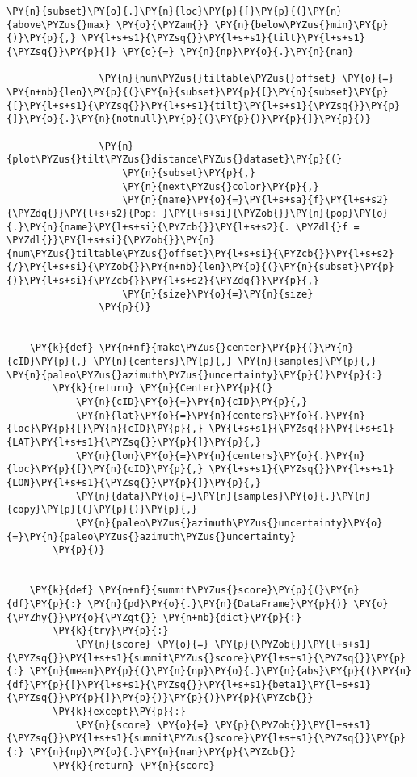 \begin{tcolorbox}[breakable, size=fbox, boxrule=1pt, pad at break*=1mm,colback=cellbackground, colframe=cellborder]
\begin{Verbatim}[commandchars=\\\{\}]
                \PY{n}{subset}\PY{o}{.}\PY{n}{loc}\PY{p}{[}\PY{p}{(}\PY{n}{above\PYZus{}max} \PY{o}{\PYZam{}} \PY{n}{below\PYZus{}min}\PY{p}{)}\PY{p}{,} \PY{l+s+s1}{\PYZsq{}}\PY{l+s+s1}{tilt}\PY{l+s+s1}{\PYZsq{}}\PY{p}{]} \PY{o}{=} \PY{n}{np}\PY{o}{.}\PY{n}{nan}
    
                \PY{n}{num\PYZus{}tiltable\PYZus{}offset} \PY{o}{=} \PY{n+nb}{len}\PY{p}{(}\PY{n}{subset}\PY{p}{[}\PY{n}{subset}\PY{p}{[}\PY{l+s+s1}{\PYZsq{}}\PY{l+s+s1}{tilt}\PY{l+s+s1}{\PYZsq{}}\PY{p}{]}\PY{o}{.}\PY{n}{notnull}\PY{p}{(}\PY{p}{)}\PY{p}{]}\PY{p}{)}
    
                \PY{n}{plot\PYZus{}tilt\PYZus{}distance\PYZus{}dataset}\PY{p}{(}
                    \PY{n}{subset}\PY{p}{,}
                    \PY{n}{next\PYZus{}color}\PY{p}{,}
                    \PY{n}{name}\PY{o}{=}\PY{l+s+sa}{f}\PY{l+s+s2}{\PYZdq{}}\PY{l+s+s2}{Pop: }\PY{l+s+si}{\PYZob{}}\PY{n}{pop}\PY{o}{.}\PY{n}{name}\PY{l+s+si}{\PYZcb{}}\PY{l+s+s2}{. \PYZdl{}f = \PYZdl{}}\PY{l+s+si}{\PYZob{}}\PY{n}{num\PYZus{}tiltable\PYZus{}offset}\PY{l+s+si}{\PYZcb{}}\PY{l+s+s2}{/}\PY{l+s+si}{\PYZob{}}\PY{n+nb}{len}\PY{p}{(}\PY{n}{subset}\PY{p}{)}\PY{l+s+si}{\PYZcb{}}\PY{l+s+s2}{\PYZdq{}}\PY{p}{,}
                    \PY{n}{size}\PY{o}{=}\PY{n}{size}
                \PY{p}{)}
    
    
    \PY{k}{def} \PY{n+nf}{make\PYZus{}center}\PY{p}{(}\PY{n}{cID}\PY{p}{,} \PY{n}{centers}\PY{p}{,} \PY{n}{samples}\PY{p}{,} \PY{n}{paleo\PYZus{}azimuth\PYZus{}uncertainty}\PY{p}{)}\PY{p}{:}
        \PY{k}{return} \PY{n}{Center}\PY{p}{(}
            \PY{n}{cID}\PY{o}{=}\PY{n}{cID}\PY{p}{,}
            \PY{n}{lat}\PY{o}{=}\PY{n}{centers}\PY{o}{.}\PY{n}{loc}\PY{p}{[}\PY{n}{cID}\PY{p}{,} \PY{l+s+s1}{\PYZsq{}}\PY{l+s+s1}{LAT}\PY{l+s+s1}{\PYZsq{}}\PY{p}{]}\PY{p}{,}
            \PY{n}{lon}\PY{o}{=}\PY{n}{centers}\PY{o}{.}\PY{n}{loc}\PY{p}{[}\PY{n}{cID}\PY{p}{,} \PY{l+s+s1}{\PYZsq{}}\PY{l+s+s1}{LON}\PY{l+s+s1}{\PYZsq{}}\PY{p}{]}\PY{p}{,}
            \PY{n}{data}\PY{o}{=}\PY{n}{samples}\PY{o}{.}\PY{n}{copy}\PY{p}{(}\PY{p}{)}\PY{p}{,}
            \PY{n}{paleo\PYZus{}azimuth\PYZus{}uncertainty}\PY{o}{=}\PY{n}{paleo\PYZus{}azimuth\PYZus{}uncertainty}
        \PY{p}{)}
    
    
    \PY{k}{def} \PY{n+nf}{summit\PYZus{}score}\PY{p}{(}\PY{n}{df}\PY{p}{:} \PY{n}{pd}\PY{o}{.}\PY{n}{DataFrame}\PY{p}{)} \PY{o}{\PYZhy{}}\PY{o}{\PYZgt{}} \PY{n+nb}{dict}\PY{p}{:}
        \PY{k}{try}\PY{p}{:}
            \PY{n}{score} \PY{o}{=} \PY{p}{\PYZob{}}\PY{l+s+s1}{\PYZsq{}}\PY{l+s+s1}{summit\PYZus{}score}\PY{l+s+s1}{\PYZsq{}}\PY{p}{:} \PY{n}{mean}\PY{p}{(}\PY{n}{np}\PY{o}{.}\PY{n}{abs}\PY{p}{(}\PY{n}{df}\PY{p}{[}\PY{l+s+s1}{\PYZsq{}}\PY{l+s+s1}{beta1}\PY{l+s+s1}{\PYZsq{}}\PY{p}{]}\PY{p}{)}\PY{p}{)}\PY{p}{\PYZcb{}}
        \PY{k}{except}\PY{p}{:}
            \PY{n}{score} \PY{o}{=} \PY{p}{\PYZob{}}\PY{l+s+s1}{\PYZsq{}}\PY{l+s+s1}{summit\PYZus{}score}\PY{l+s+s1}{\PYZsq{}}\PY{p}{:} \PY{n}{np}\PY{o}{.}\PY{n}{nan}\PY{p}{\PYZcb{}}
        \PY{k}{return} \PY{n}{score}
    

\end{Verbatim}
\end{tcolorbox}
